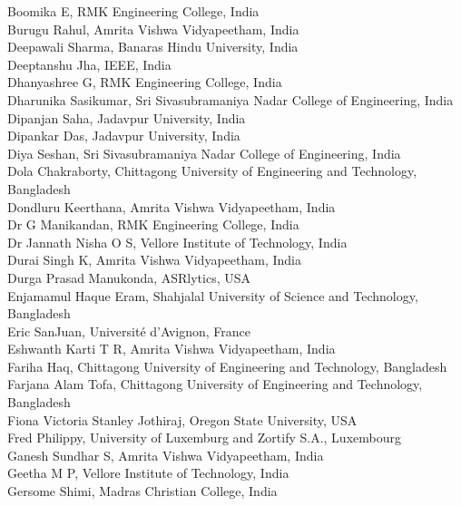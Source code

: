 \documentclass[11pt,oneside]{book}
\begin{document}
\begin{description}
          Boomika E, RMK Engineering College, India\\
          Burugu Rahul, Amrita Vishwa Vidyapeetham, India\\
          Deepawali Sharma, Banaras Hindu University, India\\
          Deeptanshu Jha, IEEE, India\\
          Dhanyashree G, RMK Engineering College, India\\
          Dharunika Sasikumar, Sri Sivasubramaniya Nadar College of Engineering, India\\
          Dipanjan Saha, Jadavpur University, India\\
          Dipankar Das, Jadavpur University, India\\
          Diya Seshan, Sri Sivasubramaniya Nadar College of Engineering, India\\
          Dola Chakraborty, Chittagong University of Engineering and Technology, Bangladesh\\
          Dondluru Keerthana, Amrita Vishwa Vidyapeetham, India\\
          Dr G Manikandan, RMK Engineering College, India\\
          Dr Jannath Nisha O S, Vellore Institute of Technology, India\\
          Durai Singh K, Amrita Vishwa Vidyapeetham, India\\
          Durga Prasad Manukonda, ASRlytics, USA\\
          Enjamamul Haque Eram, Shahjalal University of Science and Technology, Bangladesh\\
          Eric SanJuan, Université d'Avignon, France\\
          Eshwanth Karti T R, Amrita Vishwa Vidyapeetham, India\\
          Fariha Haq, Chittagong University of Engineering and Technology, Bangladesh\\
          Farjana Alam Tofa, Chittagong University of Engineering and Technology, Bangladesh\\
          Fiona Victoria Stanley Jothiraj, Oregon State University, USA\\
          Fred Philippy, University of Luxemburg and Zortify S.A., Luxembourg\\
          Ganesh Sundhar S, Amrita Vishwa Vidyapeetham, India\\
          Geetha M P, Vellore Institute of Technology, India\\
          Gersome Shimi, Madras Christian College, India\\

\end{description}
\end{document}
